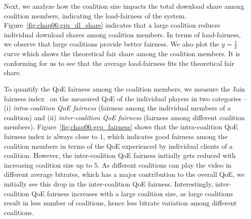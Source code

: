 Next, we analyze how the coalition size impacts the total download share among coalition members, indicating the load-fairness of the system. Figure~\ref{fig:chap06:grp_dl_share} indicates that a large coalition reduces individual download shares among coalition members. In terms of load-fairness, we observe that large coalitions provide better fairness. We also plot the $y=\frac{1}{x}$ curve which shows the theoretical fair share among the coalition members. It is conforming for us to see that the average load-fairness fits the theoretical fair share. 

To quantify the QoE fairness among the coalition members, we measure the Jain fairness index~\cite{jain1999throughput} on the measured QoE of the individual players in two categories -- (i) \textit{intra-coalition QoE fairness} (fairness among the individual members of a coalition) and (ii) \textit{inter-coalition QoE fairness} (fairness among different coalition members). Figure~\ref{fig:chap06:grp_fairness} shows that the intra-coalition QoE fairness index is always close to $1$, which indicates good fairness among the coalition members in terms of the QoE experienced by individual clients of a coalition. However, the inter-coalition QoE fairness initially gets reduced with increasing coalition size up to $5$. As different coalitions can play the video in different average bitrates, which has a major contribution to the overall QoE, we initially see this drop in the inter-coalition QoE fairness. Interestingly, inter-coalition QoE fairness increases with a large coalition size, as large coalitions result in less number of coalitions, hence less bitrate variation among different coalitions.

